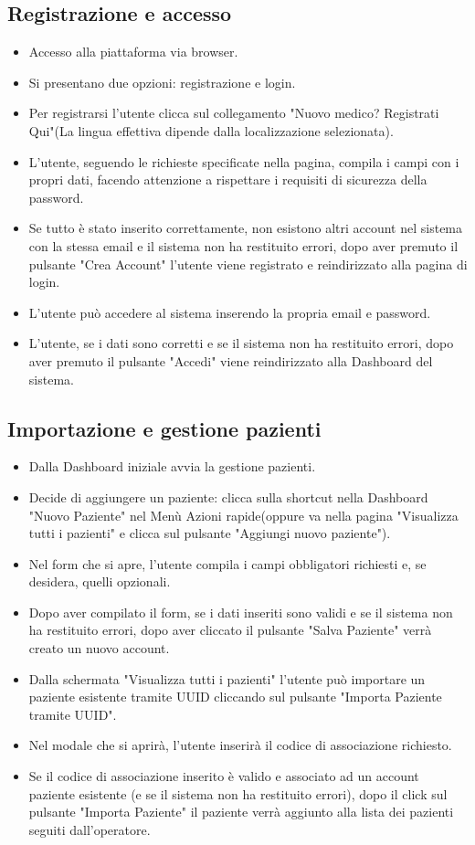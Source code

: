 \documentclass[12pt,a4paper,oneside]{report}
\begin{document}
\subsection{Registrazione e accesso}
\begin{itemize}
  \item Accesso alla piattaforma via browser.
    \item Si presentano due opzioni: registrazione e login.
    \item Per registrarsi l'utente clicca sul collegamento "Nuovo medico? Registrati Qui"(La lingua effettiva dipende dalla localizzazione selezionata).
  \item L'utente, seguendo le richieste specificate nella pagina, compila i campi con i propri dati, facendo attenzione a rispettare i requisiti di sicurezza della password.
    \item Se tutto è stato inserito correttamente, non esistono altri account nel sistema con la stessa email e il sistema non ha restituito errori, dopo aver premuto il pulsante "Crea Account" l'utente viene registrato e reindirizzato alla pagina di login.
    \item L'utente può accedere al sistema inserendo la propria email e password.
    \item L'utente, se i dati sono corretti e se il sistema non ha restituito errori, dopo aver premuto il pulsante "Accedi" viene reindirizzato alla Dashboard del sistema.
\end{itemize}
\subsection{Importazione e gestione pazienti}
\begin{itemize}
  \item Dalla Dashboard iniziale avvia la gestione pazienti.
    \item Decide di aggiungere un paziente: clicca sulla shortcut nella Dashboard "Nuovo Paziente" nel Menù Azioni rapide(oppure va nella pagina "Visualizza tutti i pazienti" e clicca sul pulsante "Aggiungi nuovo paziente").
    \item Nel form che si apre, l'utente compila i campi obbligatori richiesti e, se desidera, quelli opzionali.
    \item Dopo aver compilato il form, se i dati inseriti sono validi e se il sistema non ha restituito errori, dopo aver cliccato il pulsante "Salva Paziente" verrà creato un nuovo account.
    \item Dalla schermata "Visualizza tutti i pazienti" l'utente può importare un paziente esistente tramite UUID cliccando sul pulsante "Importa Paziente tramite UUID".
    \item Nel modale che si aprirà, l'utente inserirà il codice di associazione richiesto.
    \item Se il codice di associazione inserito è valido e associato ad un account paziente esistente (e se il sistema non ha restituito errori), dopo il click sul pulsante "Importa Paziente" il paziente verrà aggiunto alla lista dei pazienti seguiti dall'operatore.
\end{itemize}
\end{document}
